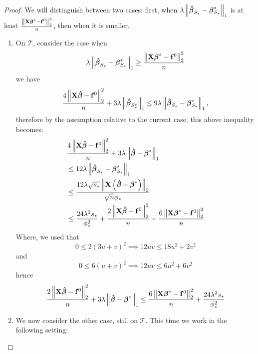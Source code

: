 \begin{proof}
    We will distinguish between two cases: first, when \(\lambda\left\|\boldsymbol{\hat{\beta}}_{S_{*}}-\boldsymbol{\beta}_{S_{*}}^{*}\right\|_{1}\) is at least \(\frac{\left\|\mathbf{X} \boldsymbol{\beta}^{*}-\mathbf{f}^{0}\right\|_{2}^{2}}{n}\), then when it is smaller.
    \begin{enumerate}
        \item On $\mathscr{T}$, consider the case when
              \[
                  \lambda\left\|\boldsymbol{\hat{\beta}}_{S_{*}}-\boldsymbol{\beta}_{S_{*}}^{*}\right\|_{1} \geq \frac{\left\|\mathbf{X} \boldsymbol{\beta}^{*}-\mathbf{f}^{0}\right\|_{2}^{2}}{n}
              \]
              we have
              \[
                  \frac{4\left\|\mathbf{X} \boldsymbol{\hat{\beta}}-\mathbf{f}^{0}\right\|_{2}^{2}}{n}+3 \lambda\left\|\boldsymbol{\hat{\beta}}_{S_{*}^{c}}\right\|_{1} \leq 9 \lambda\left\|\boldsymbol{\hat{\beta}}_{S_{*}}-\boldsymbol{\beta}_{S_{*}}^{*}\right\|_{1},
              \]
              therefore by the assumption relative to the current case, this above inequality becomes:
              \begin{align*}
                   & \frac{4\left\|\mathbf{X} \boldsymbol{\hat{\beta}}-\mathbf{f}^{0}\right\|_{2}^{2}}{n} + 3 \lambda\left\|\boldsymbol{\hat{\beta}} - \boldsymbol{\beta}^{*}\right\|_{1}                                                          \\
                   & \leq 12 \lambda\left\|\boldsymbol{\hat{\beta}}_{S_{*}}-\boldsymbol{\beta}_{S_{*}}^{*}\right\|_{1}                                                                                            \\
                   & \leq \frac{12 \lambda \sqrt{s_{*}}\left\|\mathbf{X}\left(\boldsymbol{\hat{\beta}}-\boldsymbol{\beta}^{*}\right)\right\|_{2}}{\sqrt{n} \phi_{*}}                                                      \\
                   & \leq \frac{24 \lambda^{2} s_{*}}{\phi_{*}^{2}} + \frac{2\left\|\mathbf{X} \boldsymbol{\hat{\beta}}-\mathbf{f}^{0}\right\|_{2}^{2}}{n} + \frac{6\left\|\mathbf{X} \boldsymbol{\beta}^{*} - \mathbf{f}^{0}\right\|_{2}^{2}}{n}
              \end{align*}
              Where, we used that
              \[
                  0 \leq 2(3u + v)^2                             \implies  12 u v \leq 18 u^{2}+2 v^{2}
              \]
              and
              \[
                  0 \leq 6(u + v)^2                             \implies  12 u v \leq 6 u^{2}+6 v^{2}
              \]
              hence
              \[
                  \frac{2\left\|\mathbf{X} \boldsymbol{\hat{\beta}}-\mathbf{f}^{0}\right\|_{2}^{2}}{n} + 3 \lambda\left\|\boldsymbol{\hat{\beta}}-\boldsymbol{\beta}^{*}\right\|_{1} \leq \frac{6\left\|\mathbf{X} \boldsymbol{\beta}^{*}-\mathbf{f}^{0}\right\|_{2}^{2}}{n} + \frac{24 \lambda^{2} s_{*}}{\phi_{*}^{2}}
              \]
        \item We now consider the other case, still on $\mathscr{T}$. This time we work in the following setting:

\end{enumerate}
\end{proof}
